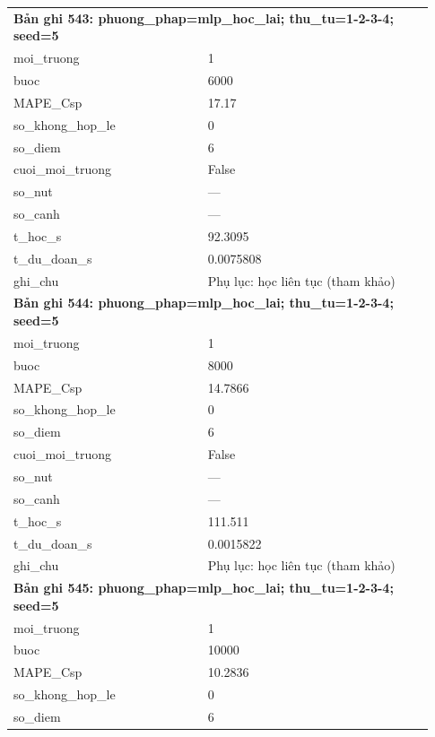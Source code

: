 \begin{longtable}{p{0.43\linewidth}p{0.50\linewidth}}
\midrule
\multicolumn{2}{p{0.95\linewidth}}{\textbf{Bản ghi 543: phuong\_phap=mlp\_hoc\_lai; thu\_tu=1-2-3-4; seed=5}} \\
moi\_\allowbreak truong & 1 \\
buoc & 6000 \\
MAPE\_\allowbreak Csp & 17.17 \\
so\_\allowbreak khong\_\allowbreak hop\_\allowbreak le & 0 \\
so\_\allowbreak diem & 6 \\
cuoi\_\allowbreak moi\_\allowbreak truong & False \\
so\_\allowbreak nut & — \\
so\_\allowbreak canh & — \\
t\_\allowbreak hoc\_\allowbreak s & 92.3095 \\
t\_\allowbreak du\_\allowbreak doan\_\allowbreak s & 0.0075808 \\
ghi\_\allowbreak chu & Phụ lục: học liên tục (tham khảo) \\
\midrule
\multicolumn{2}{p{0.95\linewidth}}{\textbf{Bản ghi 544: phuong\_phap=mlp\_hoc\_lai; thu\_tu=1-2-3-4; seed=5}} \\
moi\_\allowbreak truong & 1 \\
buoc & 8000 \\
MAPE\_\allowbreak Csp & 14.7866 \\
so\_\allowbreak khong\_\allowbreak hop\_\allowbreak le & 0 \\
so\_\allowbreak diem & 6 \\
cuoi\_\allowbreak moi\_\allowbreak truong & False \\
so\_\allowbreak nut & — \\
so\_\allowbreak canh & — \\
t\_\allowbreak hoc\_\allowbreak s & 111.511 \\
t\_\allowbreak du\_\allowbreak doan\_\allowbreak s & 0.0015822 \\
ghi\_\allowbreak chu & Phụ lục: học liên tục (tham khảo) \\
\midrule
\multicolumn{2}{p{0.95\linewidth}}{\textbf{Bản ghi 545: phuong\_phap=mlp\_hoc\_lai; thu\_tu=1-2-3-4; seed=5}} \\
moi\_\allowbreak truong & 1 \\
buoc & 10000 \\
MAPE\_\allowbreak Csp & 10.2836 \\
so\_\allowbreak khong\_\allowbreak hop\_\allowbreak le & 0 \\
so\_\allowbreak diem & 6 \\

\end{longtable}
